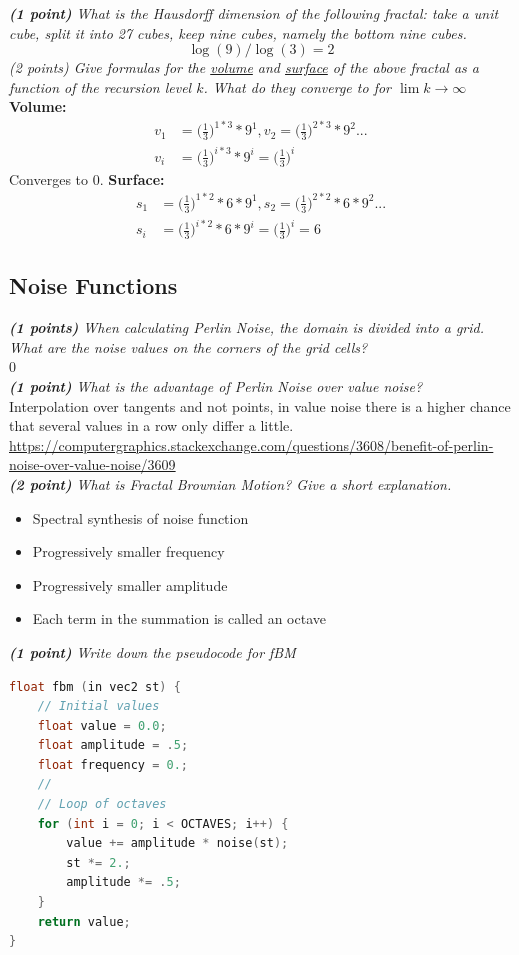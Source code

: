 \documentclass[a4paper,10pt]{article}
\begin{document}
\textit{\textbf{(1 point)} What is the Hausdorff dimension of the following fractal: take a unit cube, split it into 27 cubes, keep nine cubes, namely the bottom nine cubes.
}\\

\[\log(9)/\log(3)=2\]
\textit{(2 points) Give formulas for the \underline{volume} and \underline{surface} of the above fractal as a function of the recursion level $k$. What do they converge to for $\lim k\rightarrow\infty$}
\\
\textbf{Volume:}
\[\begin{aligned}
v_1&=\Big(\frac{1}{3}\Big)^{1*3}*9^1,v_2=\Big(\frac{1}{3}\Big)^{2*3}*9^2...\\
v_i&=\Big(\frac{1}{3}\Big)^{i*3}*9^i=\Big(\frac{1}{3}\Big)^{i}
\end{aligned}\]
Converges to 0.
\textbf{Surface:}
\[
\begin{aligned}
s_1&=\Big(\frac{1}{3}\Big)^{1*2}*6*9^1,s_2=\Big(\frac{1}{3}\Big)^{2*2}*6*9^2...\\
s_i&=\Big(\frac{1}{3}\Big)^{i*2}*6*9^i=\Big(\frac{1}{3}\Big)^{i}=6
\end{aligned}
\]
\subsection{Noise Functions}
\textit{\textbf{(1 points)} When calculating Perlin Noise, the domain is divided into a grid. What are the noise values on the corners of the grid cells?}\\

0\\

\textit{\textbf{(1 point)} What is the advantage of Perlin Noise over value noise?}\\

Interpolation over tangents and not points, in value noise there is a higher chance that several values in a row
only differ a little. \\

\url{https://computergraphics.stackexchange.com/questions/3608/benefit-of-perlin-noise-over-value-noise/3609}\\

\textit{\textbf{(2 point)} What is Fractal Brownian Motion? Give a short explanation.}

 \begin{itemize}
 	\item Spectral synthesis of noise function
 	\item Progressively smaller frequency
 	\item Progressively smaller amplitude
 	\item Each term in the summation is called an octave
 \end{itemize}
\textit{\textbf{(1 point)} Write down the pseudocode for fBM}
\begin{lstlisting}[language=C]
float fbm (in vec2 st) {
	// Initial values
	float value = 0.0;
	float amplitude = .5;
	float frequency = 0.;
	//
	// Loop of octaves
	for (int i = 0; i < OCTAVES; i++) {
		value += amplitude * noise(st);
		st *= 2.;
		amplitude *= .5;
	}
	return value;
}
\end{lstlisting}
\end{document}
